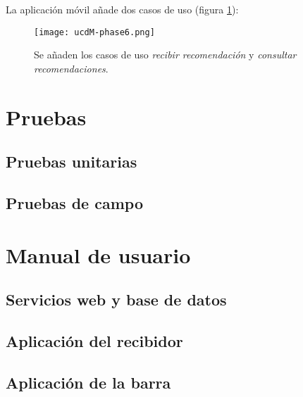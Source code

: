 La aplicación móvil añade dos casos de uso (figura \ref{fig:ucdM-phase6}):

  \begin{figure}[!h]
    \begin{center}
      \texttt{[image: ucdM-phase6.png]}
      \caption{Se añaden los casos de uso \emph{recibir recomendación} y
      \emph{consultar recomendaciones}.}
      \label{fig:ucdM-phase6}
    \end{center}
  \end{figure}




\section{Pruebas}
  \subsection{Pruebas unitarias}
  \subsection{Pruebas de campo}

\section{Manual de usuario}
  \subsection{Servicios web y base de datos}
  \subsection{Aplicación del recibidor}
  \subsection{Aplicación de la barra}
